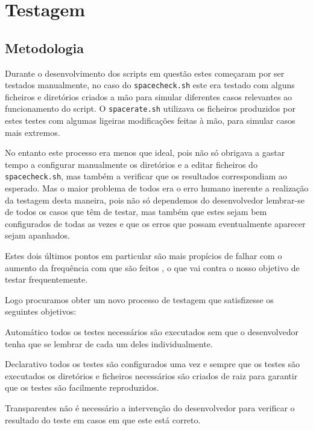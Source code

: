 \chapter{Testagem}

\section{Metodologia}\label{sec:testing_metodology}

Durante o desenvolvimento dos scripts em questão estes começaram por ser
testados manualmente, no caso do \Verb|spacecheck.sh| este era testado com alguns
ficheiros e diretórios criados a mão para simular diferentes casos relevantes ao
funcionamento do script. O \Verb|spacerate.sh| utilizava os ficheiros produzidos
por estes testes com algumas ligeiras modificações feitas à mão, para simular casos
mais extremos.

No entanto este processo era menos que ideal, pois não só obrigava a gastar
tempo a configurar manualmente os diretórios e a editar ficheiros do
\Verb|spacecheck.sh|, mas também a verificar que os
resultados correspondiam ao esperado. Mas o maior problema de todos era o erro
humano inerente a realização da testagem desta maneira, pois não só dependemos
do desenvolvedor lembrar-se de todos os casos que têm de testar, mas também que
estes sejam bem configurados de todas as vezes e que os erros que possam
eventualmente aparecer sejam apanhados.

Estes dois últimos pontos em particular são mais propícios de falhar com o
aumento da frequência com que são feitos \cite{fewster1999software, rafi2012benefits},
o que vai contra o nosso objetivo de testar frequentemente.

Logo procuramos obter um novo processo de testagem que satisfizesse os seguintes
objetivos:

\begin{enumdescript}
	\item[Automático]
	todos os testes necessários são executados sem que o desenvolvedor tenha que
	se lembrar de cada um deles individualmente.
	\item[Declarativo]
	todos os testes são configurados uma vez e sempre que os testes são
	executados os diretórios e ficheiros necessários são criados de raiz
	para garantir que os testes são facilmente reproduzidos.
	\item[Transparentes]
	não é necessário a intervenção do desenvolvedor para verificar o resultado
	do teste em casos em que este está correto.
\end{enumdescript}

